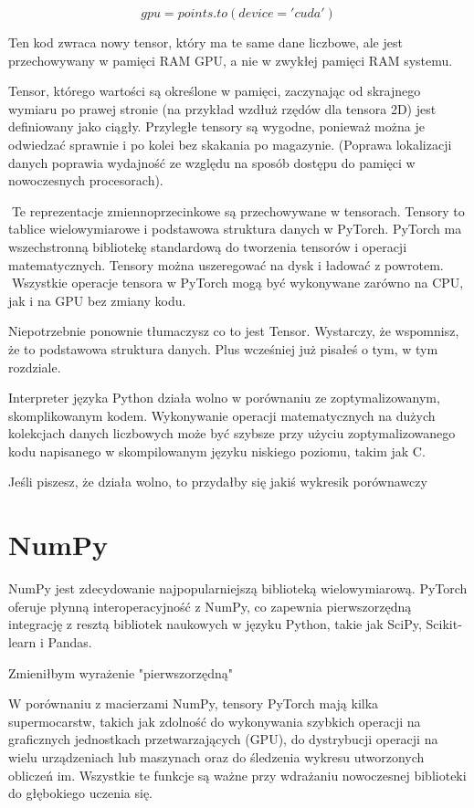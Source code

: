 \documentclass[brudnopis]{xmgr}
\begin{document}
\begin{equation}
gpu = points.to(device='cuda')
\end{equation}


Ten kod zwraca nowy tensor, który ma te same dane liczbowe, ale jest przechowywany w pamięci RAM GPU, a nie w zwykłej pamięci RAM systemu.

Tensor, którego wartości są określone w pamięci, zaczynając od skrajnego wymiaru po prawej stronie (na przykład wzdłuż rzędów dla tensora 2D) jest definiowany jako ciągły. Przyległe tensory są wygodne, ponieważ można je odwiedzać sprawnie i po kolei bez skakania po magazynie. (Poprawa lokalizacji danych poprawia wydajność ze względu na sposób dostępu do pamięci w nowoczesnych procesorach).

􏰹Te reprezentacje zmiennoprzecinkowe są przechowywane w tensorach. Tensory to tablice wielowymiarowe i podstawowa struktura danych w PyTorch. PyTorch ma wszechstronną bibliotekę standardową do tworzenia tensorów i operacji matematycznych. Tensory można uszeregować na dysk i ładować z powrotem.
􏰹Wszystkie operacje tensora w PyTorch mogą być wykonywane zarówno na CPU, jak i na GPU bez zmiany kodu.

Niepotrzebnie ponownie tłumaczysz co to jest Tensor. Wystarczy, że wspomnisz, że to podstawowa struktura danych. Plus wcześniej już pisałeś o tym, w tym rozdziale.

Interpreter języka Python działa wolno w porównaniu ze zoptymalizowanym, skomplikowanym kodem. Wykonywanie operacji matematycznych na dużych kolekcjach danych liczbowych może być szybsze przy użyciu zoptymalizowanego kodu napisanego w skompilowanym języku niskiego poziomu, takim jak C.

Jeśli piszesz, że działa wolno, to przydałby się jakiś wykresik porównawczy

    \section{NumPy\label{s:dsssl}}
    
    NumPy jest zdecydowanie najpopularniejszą biblioteką wielowymiarową. PyTorch oferuje płynną interoperacyjność z NumPy, co zapewnia pierwszorzędną integrację z resztą bibliotek naukowych w języku Python, takie jak SciPy, Scikit-learn i Pandas.
    
    Zmieniłbym wyrażenie "pierwszorzędną"

W porównaniu z macierzami NumPy, tensory PyTorch mają kilka supermocarstw, takich jak zdolność do wykonywania szybkich operacji na graficznych jednostkach przetwarzających (GPU), do dystrybucji operacji na wielu urządzeniach lub maszynach oraz do śledzenia wykresu utworzonych obliczeń im. Wszystkie te funkcje są ważne przy wdrażaniu nowoczesnej biblioteki do głębokiego uczenia się.
\end{document}
